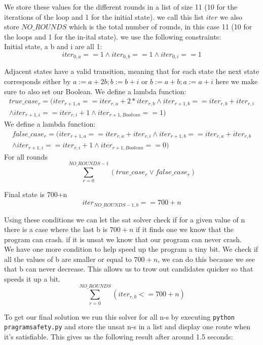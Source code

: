 \documentclass[12pt]{article}
\begin{document}
We store these values for the different rounds in a list of size 11 (10 for the iterations of the loop and 1 for the initial state). we call this list $iter$ we also store $NO\_ROUNDS$ which is the total number of rounds, in this case 11 (10 for the loops and 1 for the in-ital state).
we use the following constraints:\\
Initial state, a b and i are all 1:
\[iter_{0,a} == 1 \land iter_{0,b} == 1 \land iter_{0,i} == 1 \]

Adjacent states have a valid transition, meaning that for each state the next state corresponds either by ${a := a + 2b; b := b + i}$ or ${b := a + b; a := a + i}$ here we make sure to also set our Boolean.
We define a lambda function:
\[ \begin{array}{c} true\_case_r  = (iter_{r +1 ,a} == iter_{r,a} + 2*iter_{r,b} \land iter_{r +1 ,b} ==  iter_{r,b}+ iter_{r,i} \\ \land iter_{r +1 ,i} == iter_{r ,i}+1 \land iter_{r +1 ,Boolean} == 1 )
\end{array} \]
We define a lambda function:
\[ \begin{array}{c} false\_case_r  = (iter_{r +1 ,a} == iter_{r,a} + iter_{r,i} \land iter_{r +1 ,b} ==  iter_{r,a} +iter_{r,b} \\ \land iter_{r +1 ,i} == iter_{r ,i}+1 \land iter_{r +1 ,Boolean } == 0 )
\end{array} \]
For all rounds 
\[ \sum_{r=0}^{NO\_ROUNDS - 1} \left(  true\_case_r \lor false\_case_r \right)\]

Final state is 700+n
\[ iter_{NO\_ROUNDS -1 ,b} == 700+n\]

Using these conditions we can let the sat solver check if for a given value of n there is a case where the last b is $700+n$ if it finds one we  know that the program can crash. if it is unsat we know that our program can never crash.
\\
We have one more condition to help speed up the program a tiny bit. We check if all the values of b are smaller or equal to $700+n$, we can do this because we see that b can never decrease. This allows us to trow out candidates quicker so that speeds it up a bit.  
\[\sum_{r=0}^{NO\_ROUNDS} \left( iter_{r,b} <= 700+n \right)\]

To get our final solution we run this solver for all n-s by executing {\tt python pragramsafety.py} and store the unsat n-s in a list and display one route when it's satisfiable. This gives us the following result after around 1.5 seconds:\\
\end{document}
